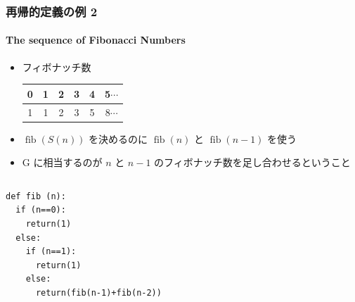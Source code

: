 \begin{frame}[fragile]
\frametitle{再帰的定義の例 2}
\framesubtitle{The sequence of Fibonacci Numbers}
  \begin{itemize}
\item フィボナッチ数\\
    \begin{tabular}{c|c|c|c|c|c}
0&1&2&3&4&5$\cdots$\\
\hline
1&1&2&3&5&8$\cdots$
    \end{tabular}
\item \({\mathop{\mathrm{fib}}}(S(n))\) を決めるのに \({\mathop{\mathrm{fib}}}(n)\) と \({\mathop{\mathrm{fib}}}(n-1)\) を使う
\item G に相当するのが \(n\) と \(n-1\) のフィボナッチ数を足し合わせるということ
  \end{itemize}
  \begin{columns}[c]
    \begin{column}{0.5\textwidth}
      \begin{lstlisting}[caption={フィボナッチ数},label=fib-rec]
def fib (n):
  if (n==0):
    return(1)
  else:
    if (n==1):
      return(1)
    else:
      return(fib(n-1)+fib(n-2))
      \end{lstlisting}
    \end{column}
    \begin{column}{0.45\textwidth}
      \begin{example}[fib\((5)\)]
        \begin{center}

\end{center}
\end{example}
\end{column}
\end{columns}
\end{frame}
